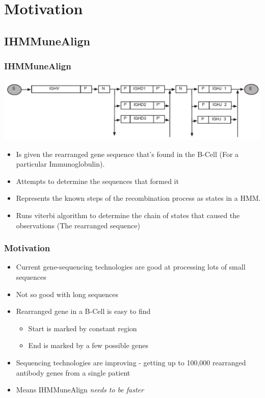 \documentclass{beamer}
\begin{document}
\section{Motivation}

\subsection{IHMMuneAlign}

\begin{frame}
\frametitle{IHMMuneAlign}
\includegraphics[width=\textwidth]{model.pdf}
\begin{itemize}
 \item Is given the rearranged gene sequence that's found in the B-Cell (For a particular Immunoglobulin).
 \item Attempts to determine the sequences that formed it
 \item Represents the known steps of the recombination process as states in a HMM.
 \item Runs viterbi algorithm to determine the chain of states that caused the observations (The rearranged sequence)
\end{itemize}
\end{frame}

\begin{frame}
\frametitle{Motivation}
 \begin{itemize}
  \item Current gene-sequencing technologies are good at processing lots of small sequences
  \item Not so good with long sequences
  \item Rearranged gene in a B-Cell is easy to find
  \begin{itemize}
   \item Start is marked by constant region
   \item End is marked by a few possible genes
  \end{itemize}
  \item Sequencing technologies are improving - getting up to 100,000 rearranged antibody genes from a single patient
  \item Means IHMMuneAlign \emph{needs to be faster}
 \end{itemize}
\end{frame}
\end{document}
